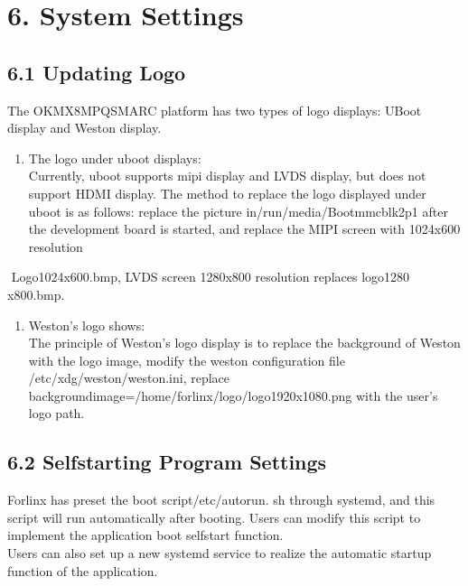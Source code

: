 \documentclass[letterpaper,10pt,openany,english]{sphinxmanual}
\begin{document}
\chapter{6. System Settings}
\label{\detokenize{linux-manual:system-settings}}

\section{6.1 Updating Logo}
\label{\detokenize{linux-manual:updating-logo}}
\sphinxAtStartPar
The OK\sphinxhyphen{}MX8MPQ\sphinxhyphen{}SMARC platform has two types of logo displays: U\sphinxhyphen{}Boot display and Weston display.
\begin{enumerate}
%
\item {} 
\sphinxAtStartPar
The logo under uboot displays:\\
Currently, uboot supports mipi display and LVDS display, but does not support HDMI display. The method to replace the logo displayed under uboot is as follows: replace the picture in/run/media/Boot\sphinxhyphen{}mmcblk2p1 after the development board is started, and replace the MIPI screen with 1024x600 resolution

\end{enumerate}

\sphinxAtStartPar
​      Logo\sphinxhyphen{}1024x600.bmp, LVDS screen 1280x800 resolution replaces logo\sphinxhyphen{}1280 x800.bmp.
\begin{enumerate}
%
\setcounter{enumi}{1}
\item {} 
\sphinxAtStartPar
Weston’s logo shows:\\
The principle of Weston’s logo display is to replace the background of Weston with the logo image, modify the weston configuration file /etc/xdg/weston/weston.ini, replace background\sphinxhyphen{}image=/home/forlinx/logo/logo\sphinxhyphen{}1920x1080.png with the user’s logo path.

\end{enumerate}


\section{6.2 Self\sphinxhyphen{}starting Program Settings}
\label{\detokenize{linux-manual:self-starting-program-settings}}
\sphinxAtStartPar
Forlinx has preset the boot script/etc/autorun. sh through systemd, and this script will run automatically after booting. Users can modify this script to implement the application boot self\sphinxhyphen{}start function.\\
Users can also set up a new systemd service to realize the automatic startup function of the application.
\end{document}
